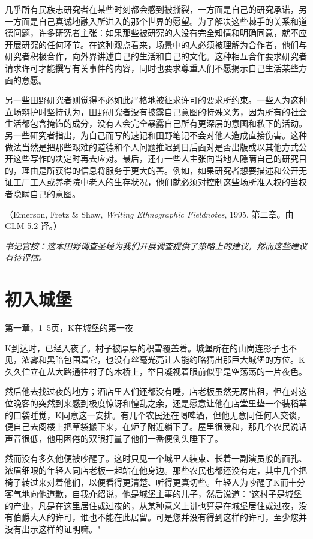 \documentclass[12pt,a4paper]{article}
\newcommand{\clerknote}[1]{%
  \vspace{1.2em}%
  {\kaishu\small\textit{书记官按：#1}}%
}
\newcommand{\sourcenote}[1]{%
  \par\vspace{0.5em}%
  {\footnotesize\color{gray}（#1）}%
}
\begin{document}
几乎所有民族志研究者在某些时刻都会感到被撕裂，一方面是自己的研究承诺，另一方面是自己真诚地融入所进入的那个世界的愿望。为了解决这些棘手的关系和道德问题，许多研究者主张：如果那些被研究的人没有完全知情和明确同意，就不应开展研究的任何环节。在这种观点看来，场景中的人必须被理解为合作者，他们与研究者积极合作，向外界讲述自己的生活和自己的文化。这种相互合作要求研究者请求许可才能撰写有关事件的内容，同时也要求尊重人们不愿揭示自己生活某些方面的意愿。

另一些田野研究者则觉得不必如此严格地被征求许可的要求所约束。一些人为这种立场辩护时坚持认为，田野研究者没有披露自己意图的特殊义务，因为所有的社会生活都包含掩饰的成分，没有人会完全暴露自己所有更深层的意图和私下的活动。另一些研究者指出，为自己而写的速记和田野笔记不会对他人造成直接伤害。这种做法当然是把那些艰难的道德和个人问题推迟到日后面对是否出版或以其他方式公开这些写作的决定时再去应对。最后，还有一些人主张向当地人隐瞒自己的研究目的，理由是所获得的信息将服务于更大的善。例如，如果研究者想要描述和公开无证工厂工人或养老院中老人的生存状况，他们就必须对控制这些场所准入权的当权者隐瞒自己的意图。
\sourcenote{Emerson, Fretz \& Shaw, \textit{Writing Ethnographic Fieldnotes}, 1995, 第二章。由 GLM 5.2 译。}

\clerknote{这本田野调查圣经为我们开展调查提供了策略上的建议，然而这些建议有待评估。}

\newpage

\section{初入城堡}

{\small\sffamily 第一章，1--5页，K在城堡的第一夜}

K到达时，已经入夜了。村子被厚厚的积雪覆盖着。城堡所在的山岗连影子也不见，浓雾和黑暗包围着它，也没有丝毫光亮让人能约略猜出那巨大城堡的方位。K久久伫立在从大路通往村子的木桥上，举目凝视着眼前似乎是空荡荡的一片夜色。

然后他去找过夜的地方；酒店里人们还都没有睡，店老板虽然无房出租，但在对这位晚客的突然到来感到极度惊讶和惶乱之余，还是愿意让他在店堂里垫一个装稻草的口袋睡觉，K同意这一安排。有几个农民还在喝啤酒，但他无意同任何人交谈，便自己去阁楼上把草袋搬下来，在炉子附近躺下了。屋里很暖和，那几个农民说话声音很低，他用困倦的双眼打量了他们一番便倒头睡下了。

然而没有多久他便被吵醒了。这时只见一个城里人装束、长着一副演员般的面孔、浓眉细眼的年轻人同店老板一起站在他身边。那些农民也都还没有走，其中几个把椅子转过来对着他们，以便看得更清楚、听得更真切些。年轻人为吵醒了K而十分客气地向他道歉，自我介绍说，他是城堡主事的儿子，然后说道："这村子是城堡的产业，凡是在这里居住或过夜的，从某种意义上讲也算是在城堡居住或过夜，没有伯爵大人的许可，谁也不能在此居留。可是您并没有得到这样的许可，至少您并没有出示这样的证明嘛。"
\end{document}
